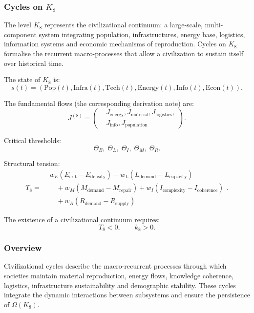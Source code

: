 
\subsubsection{Cycles on \texorpdfstring{$K_8$}{K_8}}
\label{sec:cycles-k8}

The level $K_8$ represents the civilizational continuum: a large-scale,
multi-component system integrating population, infrastructures, energy base,
logistics, information systems and economic mechanisms of reproduction.
Cycles on $K_8$ formalise the recurrent macro-processes that allow a
civilization to sustain itself over historical time.

The state of $K_8$ is:
\[
  s(t) = (\text{Pop}(t), \text{Infra}(t), \text{Tech}(t),
           \text{Energy}(t), \text{Info}(t), \text{Econ}(t)).
\]

The fundamental flows (the corresponding derivation note) are:
\[
  J^{(8)} =
  \left(
  \begin{aligned}
   &J_{\mathrm{energy}}, J_{\mathrm{material}}, J_{\mathrm{logistics}},\\
   &J_{\mathrm{info}}, J_{\mathrm{population}}
  \end{aligned}
  \right).
\]

Critical thresholds:
\[
  \Theta_E,\;
  \Theta_L,\;
  \Theta_I,\;
  \Theta_M,\;
  \Theta_R.
\]

Structural tension:
\[
  T_8 = 
  \begin{aligned}
    &w_E(E_{\mathrm{crit}} - E_{\mathrm{density}})
    + w_L(L_{\mathrm{demand}} - L_{\mathrm{capacity}})\\
    &\quad + w_M(M_{\mathrm{demand}} - M_{\mathrm{repair}})
    + w_I(I_{\mathrm{complexity}} - I_{\mathrm{coherence}})\\
    &\quad + w_R(R_{\mathrm{demand}} - R_{\mathrm{supply}})
  \end{aligned}
  .
\]

The existence of a civilizational continuum requires:
\[
  T_8 < 0,\qquad k_8>0.
\]

\subsubsection{Overview}

Civilizational cycles describe the macro-recurrent processes through which
societies maintain material reproduction, energy flows, knowledge coherence,
logistics, infrastructure sustainability and demographic stability.  
These cycles integrate the dynamic interactions between subsystems and ensure
the persistence of $\Omega(K_8)$.

